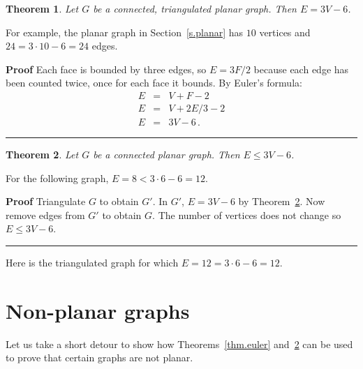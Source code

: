 \documentclass[11pt,a4paper]{article}
\newtheorem{theorem}{Theorem}
\newcommand*{\qed}{\hfill\rule{1ex}{1.5ex}}
\newenvironment{form}[1]{%
\begin{displaymath}%
\renewcommand{\arraystretch}{#1}%
\begin{array}{lcl}}%
{\end{array}%
\end{displaymath}%
}
\begin{document}
\begin{theorem}
Let $G$ be a connected, triangulated planar graph. Then $E= 3V-6$.
\end{theorem}

For example, the planar graph in Section~\ref{s.planar} has $10$ vertices and $24= 3\cdot 10-6=24$ edges.

\textbf{Proof}
Each face is bounded by three edges, so $E=3F/2$ because each edge has been counted twice, once for each face it bounds. By Euler's formula:
\begin{form}{1}
E&=&V+F-2\\
E&=&V+2E/3-2\\
E&=&3V-6\,.
\end{form}
\vspace*{-5ex}
\qed

\newpage

\begin{theorem}\label{thm.count}
Let $G$ be a connected planar graph. Then $E\leq 3V-6$.
\end{theorem}

For the following graph, $E=8< 3\cdot 6 - 6= 12$.

\begin{center}
\end{center}

\textbf{Proof}
Triangulate $G$ to obtain $G'$. In $G'$, $E= 3V-6$ by Theorem~\ref{thm.count}. Now remove edges from $G'$ to obtain $G$. The number of vertices does not change so  $E\leq 3V-6$.
\qed

Here is the triangulated graph for which $E=12=3\cdot 6 - 6= 12$.
\begin{center}
\end{center}

\section{Non-planar graphs}
Let us take a short detour to show how Theorems~\ref{thm.euler} and~\ref{thm.count} can be used to prove that certain graphs are not planar.
\end{document}
